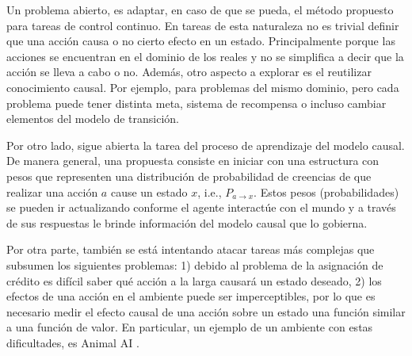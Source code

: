 Un problema abierto, es adaptar, en caso de que se pueda, el método propuesto para 
tareas de control continuo. En tareas de esta naturaleza no es trivial definir que una acción 
causa o no cierto efecto en un estado. Principalmente porque las acciones se encuentran
en el dominio de los reales y no se simplifica a decir que la acción se lleva a cabo o no.
Además, otro aspecto a explorar es el reutilizar conocimiento causal. Por ejemplo, 
para problemas del mismo dominio, pero cada problema puede tener distinta meta, sistema
de recompensa o incluso cambiar elementos del modelo de transición.

Por otro lado, sigue abierta la tarea del proceso de aprendizaje del modelo
causal. De manera general, una propuesta consiste en iniciar con una estructura con pesos que representen 
una distribución de probabilidad de creencias de que realizar una acción $a$ cause un estado $x$, i.e., $P_{a\rightarrow x}$. Estos pesos (probabilidades) se pueden
ir actualizando conforme el agente interactúe con el mundo y
a través de sus respuestas le brinde información del modelo causal que lo gobierna.

Por otra parte, también se está intentando atacar tareas más 
complejas que subsumen los siguientes problemas: 1) debido al problema de la asignación de crédito es difícil saber qué acción a la larga causará un estado deseado, 2) los efectos de una acción en el ambiente puede ser imperceptibles, por lo que es necesario medir el efecto causal de una acción sobre un estado una función similar a una función de valor. En particular, un ejemplo de un ambiente con estas dificultades, es Animal AI \cite{beyret2019animalai}.




